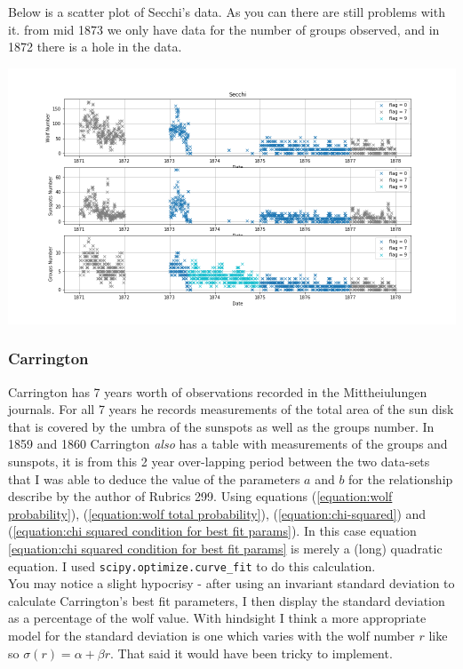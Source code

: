 \documentclass[12pt]{article}
\begin{document}
Below is a scatter plot of Secchi's data. As you can there are still problems with it. from mid 1873 we only have data for the number of groups observed, and in 1872 there is a hole in the data.\\

{\centering
    \includegraphics[width=\linewidth]{secchi_seperate_flags.png}
\par}

\subsubsection{Carrington}
Carrington has 7 years worth of observations recorded in the Mittheiulungen journals. For all 7 years he records measurements of the total area of the sun disk that is covered by the umbra of the sunspots as well as the groups number. In 1859 and 1860 Carrington \textit{also} has a table with measurements of the groups and sunspots, it is from this 2 year over-lapping period between the two data-sets that I was able to deduce the value of the parameters $a$ and $b$ for the relationship describe by the author of Rubrics 299. Using equations (\ref{equation:wolf probability}), (\ref{equation:wolf total probability}), (\ref{equation:chi-squared}) and (\ref{equation:chi squared condition for best fit params}). In this case equation \ref{equation:chi squared condition for best fit params} is merely a (long) quadratic equation. I used \texttt{scipy.optimize.curve\_fit} to do this calculation. \\

You may notice a slight hypocrisy - after using an invariant standard deviation to calculate Carrington's best fit parameters, I then display the standard deviation as a percentage of the wolf value. With hindsight I think a more appropriate model for the standard deviation is one which varies with the wolf number $r$ like so $\sigma(r) = \alpha + \beta r$. That said it would have been tricky to implement. \\
\end{document}
